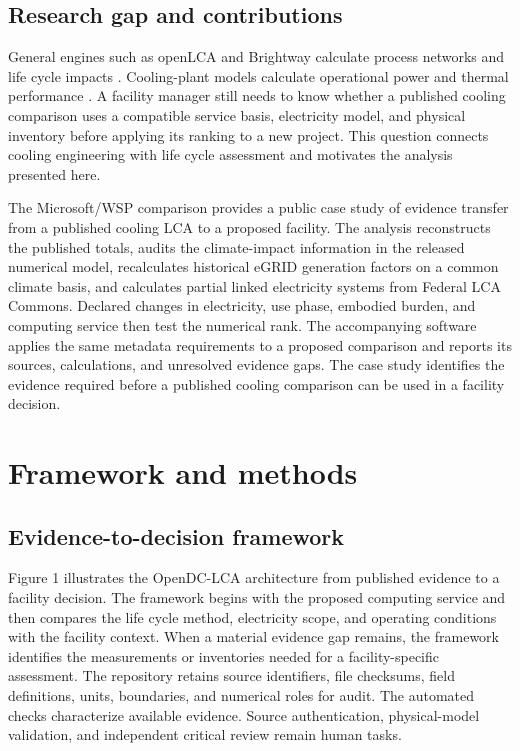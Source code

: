 \documentclass[review,a4paper,fleqn]{cas-sc}
\begin{document}
\subsection{Research gap and contributions}
General engines such as openLCA and Brightway calculate process networks and life cycle impacts \cite{ref37,ref38}. Cooling-plant models calculate operational power and thermal performance \cite{ref17}. A facility manager still needs to know whether a published cooling comparison uses a compatible service basis, electricity model, and physical inventory before applying its ranking to a new project. This question connects cooling engineering with life cycle assessment and motivates the analysis presented here.

The Microsoft/WSP comparison provides a public case study of evidence transfer from a published cooling LCA to a proposed facility. The analysis reconstructs the published totals, audits the climate-impact information in the released numerical model, recalculates historical eGRID generation factors on a common climate basis, and calculates partial linked electricity systems from Federal LCA Commons. Declared changes in electricity, use phase, embodied burden, and computing service then test the numerical rank. The accompanying software applies the same metadata requirements to a proposed comparison and reports its sources, calculations, and unresolved evidence gaps. The case study identifies the evidence required before a published cooling comparison can be used in a facility decision.

\section{Framework and methods}
\subsection{Evidence-to-decision framework}
Figure 1 illustrates the OpenDC-LCA architecture from published evidence to a facility decision. The framework begins with the proposed computing service and then compares the life cycle method, electricity scope, and operating conditions with the facility context. When a material evidence gap remains, the framework identifies the measurements or inventories needed for a facility-specific assessment. The repository retains source identifiers, file checksums, field definitions, units, boundaries, and numerical roles for audit. The automated checks characterize available evidence. Source authentication, physical-model validation, and independent critical review remain human tasks.
\end{document}
